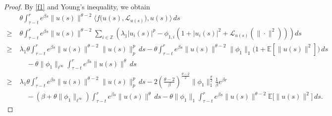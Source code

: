 \documentclass[11pt]{article}
\numberwithin{equation}{section}
\theoremstyle{plain}
\begin{document}
\begin{proof}
 By \eqref{f1} and Young's inequality, we obtain 
 \begin{align}\label{moment_h1}
 	& \theta \int_{\tau-t}^{r}
 	e^{\beta s} \|u(s)\|^{\theta-2}
 	\big\langle f\big(u(s), \mathcal{L}_{u(s)}\big), u(s) \big\rangle \, ds
 	\nonumber\\
 	\ge\; &
 	\theta \int_{\tau-t}^{r}
 	e^{\beta s} \|u(s)\|^{\theta-2}
 	\sum_{i \in \mathbb{Z}}
 	\left(
 	\lambda_1 |u_i(s)|^p
 	- \phi_{1,i}
 	\left( 1 + |u_i(s)|^2 + \mathcal{L}_{u(s)}(\|\cdot\|^2) \right)
 	\right) ds
 	\nonumber\\
 	\ge\; &
 	\lambda_1 \theta
 	\int_{\tau-t}^{r}
 	e^{\beta s} \|u(s)\|^{\theta-2} \|u(s)\|_p^p \, ds
 	- \theta
 	\int_{\tau-t}^{r}
 	e^{\beta s} \|u(s)\|^{\theta-2} \|\phi_1\|_1
 	\bigl( 1 + \mathbb{E}[\|u(s)\|^2] \bigr) \, ds
 	\nonumber\\
 	& \quad
 	- \theta \|\phi_1\|_{\ell^\infty}
 	\int_{\tau-t}^{r}
 	e^{\beta s} \|u(s)\|^{\theta} \, ds
 	\nonumber\\
 	\ge\; &
 	\lambda_1 \theta
 	\int_{\tau-t}^{r}
 	e^{\beta s} \|u(s)\|^{\theta-2} \|u(s)\|_p^p \, ds
 	- 2 \left( \frac{\theta-2}{\beta} \right)^{\frac{\theta-2}{2}}
 	\|\phi_1\|_1^{\frac{\theta}{2}}
 	\frac{1}{\beta} e^{\beta r}
 	\nonumber\\
 	& \quad
 	- \left( \beta + \theta \|\phi_1\|_{\ell^\infty} \right)
 	\int_{\tau-t}^{r}
 	e^{\beta s} \|u(s)\|^{\theta} \, ds
 	- \theta \|\phi_1\|_1
 	\int_{\tau-t}^{r}
 	e^{\beta s} \|u(s)\|^{\theta-2}
 	\mathbb{E}\bigl[\|u(s)\|^{2}\bigr] \, ds .
 \end{align}


\end{proof}
\end{document}
